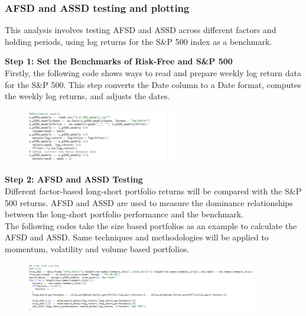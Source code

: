 \documentclass{article}
\begin{document}
\hypertarget{AFSD and ASSD testing and plotting}{%
\subsubsection{AFSD and ASSD testing and plotting}\label{AFSD and ASSD testing and plotting}}

This analysis involves testing AFSD and ASSD across different factors and holding periods, using log returns for the S\&P 500 index as a benchmark.

\textbf{Step 1: Set the Benchmarks of Risk-Free and S\&P 500}\\
Firstly, the following code shows ways to read and prepare weekly log return data for the S\&P 500. This step converts the Date column to a Date format, computes the weekly log returns, and adjusts the dates.
\begin{figure}[H]
    \centering
    \includegraphics[width=0.6\textwidth]{15.png}
    \label{fig:example}
\end{figure}
\textbf{Step 2: AFSD and ASSD Testing}\\
Different factor-based long-short portfolio returns will be compared with the S\&P 500 returns. AFSD and ASSD are used to measure the dominance relationships between the long-short portfolio performance and the benchmark.\\
The following codes take the size based portfolios as an example to calculate the AFSD and ASSD. Same techniques and methodologies will be applied to momentum, volatility and volume based portfolios.



\begin{figure}[H]
    \centering
    \includegraphics[width=0.9\textwidth]{19.png}
    \label{fig:example}
\end{figure}
\end{document}
